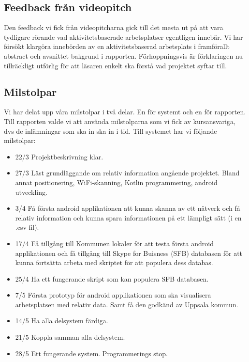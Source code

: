 \documentclass[swedish, a4paper,12pt]{article}
\begin{document}
\subsection{Feedback från videopitch}
Den feedback vi fick från videopitcharna gick till det mesta ut på att vara tydligare rörande vad aktivitetsbaserade arbetsplatser egentligen innebär.
Vi har försökt klargöra innebörden av en aktivitetsbaserad arbetsplats i framförallt abstract och avsnittet bakgrund i rapporten. Förhoppningsvis är förklaringen nu tillräckligt utförlig för att läsaren enkelt ska förstå vad projektet syftar till.


\subsection{Milstolpar}
Vi har delat upp våra milstolpar i två delar. En för systemt och en för rapporten. Till rapporten valde vi att använda milstolparna som vi fick av kursansvariga, dvs de inlämningar som ska in ska in i tid. Till systemet har vi följande milstolpar:
\begin{itemize}
	\item 22/3 Projektbeskrivning klar.
	\item 27/3 Läst grundläggande om relativ information angående projektet. Bland annat positionering, WiFi-skanning, Kotlin programmering, android utveckling.
	\item 3/4 Få första android applikationen att kunna skanna av ett nätverk och få relativ information och kunna spara informationen på ett lämpligt sätt (i en .csv fil).
	\item 17/4 Få tillgång till Kommunen lokaler för att testa första android applikationen och få tillgång till Skype for Buisness (SFB) databasen för att kunna fortsätta arbeta med skriptet för att populera dess databas.
 	\item 25/4 Ha ett fungerande skript som kan populera  SFB databasen.
	\item 7/5 Första prototyp för android applikationen som ska visualisera arbetsplatsen med relativ data. Samt få den godkänd av Uppsala kommun.
	\item 14/5 Ha alla delsystem färdiga.
	\item 21/5 Koppla samman alla delsystem.
	\item 28/5 Ett fungerande system. Programmerings stop.
\end{itemize}
\fi
\end{document}
